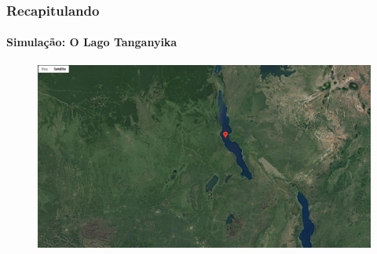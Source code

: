 \documentclass[aspectratio=169]{beamer} %
\begin{document}
{{
\begin{frame}

\frametitle{Recapitulando}
	\framesubtitle{Simulação: O Lago Tanganyika}
	\pause
	\begin{figure}
		\centering
		\includegraphics[scale=0.15]{images/Tanganyitka.png}
	\end{figure}
\end{frame} 
}

{
\begin{frame}


\end{frame}}}
\end{document}
